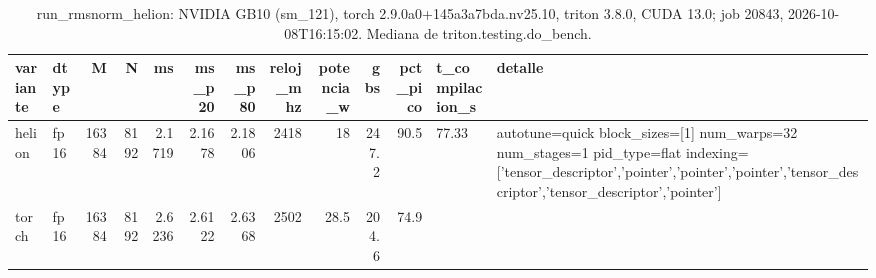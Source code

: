 \begin{table}[htbp]
  \centering\small
  \begin{tabular}{llrrrrrrrrrll}
    \toprule
    variante & dtype & M & N & ms & ms\_p20 & ms\_p80 & reloj\_mhz & potencia\_w & gbs & pct\_pico & t\_compilacion\_s & detalle \\
    \midrule
    helion & fp16 & 16384 & 8192 & 2.1719 & 2.1678 & 2.1806 & 2418 & 18 & 247.2 & 90.5 & 77.33 & autotune=quick block\_sizes=[1] num\_warps=32 num\_stages=1 pid\_type=flat indexing=['tensor\_descriptor','pointer','pointer','pointer','tensor\_descriptor','tensor\_descriptor','pointer'] \\
    torch & fp16 & 16384 & 8192 & 2.6236 & 2.6122 & 2.6368 & 2502 & 28.5 & 204.6 & 74.9 &  &  \\
    \bottomrule
  \end{tabular}
  \caption{run\_rmsnorm\_helion: NVIDIA GB10 (sm\_121), torch 2.9.0a0+145a3a7bda.nv25.10, triton 3.8.0, CUDA 13.0; job 20843, 2026-10-08T16:15:02. Mediana de triton.testing.do\_bench.}
  \label{tab:hennessy-frio-run-rmsnorm-helion}
\end{table}
